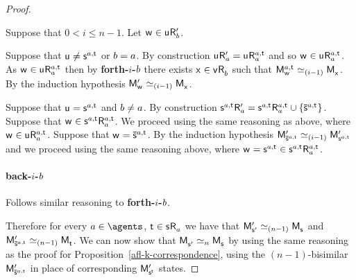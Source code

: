 \begin{proof}
\begin{enumerate}
            Suppose that $0 < i \leq n - 1$.
            Let $\aStateW \in \aStateU \aAccessibility[\prime]{\agentB}$.

            Suppose that $\aStateU \neq \aStateS[\agentA,\aStateT]$ or $b = a$.
            By construction $\aStateU \aAccessibility[\prime]{\agentA} = \aStateU \aAccessibility[\agentA,\aStateT]{\agentA}$ and so $\aStateW \in \aStateU \aAccessibility[\agentA,\aStateT]{\agentA}$. 
            As $\aStateW \in \aStateU \aAccessibility[\agentA,\aStateT]{\agentA}$ then by {\bf forth-$i$-$b$} there exists $\aStateX \in \aStateV \aAccessibility{\agentB}$ such that $\aPModel[\agentA,\aStateT]{\aStateW} \bisimilar[(i - 1)] \aPModel{\aStateX}$.
            By the induction hypothesis $\aPModel[\prime]{\aStateW} \bisimilar[(i - 1)] \aPModel{\aStateX}$.

            Suppose that $\aStateU = \aStateS[\agentA,\aStateT]$ and $b \neq a$. 
            By construction $\aStateS[\agentA,\aStateT] \aAccessibility[\prime]{\agentA} = \aStateS[\agentA,\aStateT] \aAccessibility[\agentA,\aStateT]{\agentA} \cup \{\aPStateS[\agentA,\aStateT]\}$. 
            Suppose that $\aStateW \in \aStateS[\agentA,\aStateT] \aAccessibility[\agentA,\aStateT]{\agentA}$. 
            We proceed using the same reasoning as above, where $\aStateW \in \aStateU \aAccessibility[\agentA,\aStateT]{\agentA}$. 
            Suppose that $\aStateW = \aPStateS[\agentA,\aStateT]$.
            By the induction hypothesis $\aPModel[\prime]{\aPStateS[\agentA,\aStateT]} \bisimilar[(i - 1)] \aPModel[\prime]{\aStateS[\agentA,\aStateT]}$ and we proceed using the same reasoning above, where $\aStateW = \aStateS[\agentA,\aStateT] \in \aStateS[\agentA,\aStateT] \aAccessibility[\agentA,\aStateT]{\agentA}$.

            \paragraph{back-$i$-$b$} Follows similar reasoning to {\bf forth-$i$-$b$}.
    \end{enumerate}

    Therefore for every $\agentA \in \agents$, $\aStateT \in \aStateS \aAccessibility{\agentA}$ we have that $\aPModel[\prime]{\aStateS[\prime]} \bisimilar[(n - 1)] \aPModel{\aStateS}$ and $\aPModel[\prime]{\aPStateS[\agentA,\aStateT]} \bisimilar[(n - 1)] \aPModel{\aStateT}$.
    We can now show that $\aPModel{\aStateS[\prime]} \bisimilar[n] \aPModel{\aStateS}$ by using the same reasoning as the proof for Proposition~\ref{afl-k-correspondence}, using the $(n-1)$-bisimilar $\aPModel[\prime]{\aPStateS[\agentA,\aStateT]}$ in place of corresponding $\aPModel[\prime]{\aStateS[\aStateT]}$ states.
\end{proof}

